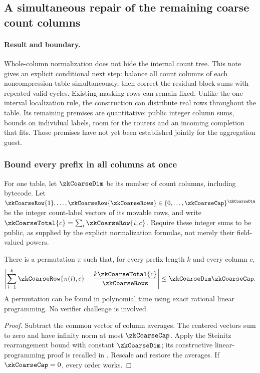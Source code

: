 \subsection{A simultaneous repair of the remaining coarse count columns}\label{note:zk-count-coarse-balance}

\paragraph{Result and boundary.} Whole-column normalization does not hide the internal count tree. This note gives an explicit conditional next step: balance all count columns of each noncompression table simultaneously, then correct the residual block sums with repeated valid cycles. Existing masking rows can remain fixed. Unlike the one-interval localization rule, the construction can distribute real rows throughout the table. Its remaining premises are quantitative: public integer column sums, bounds on individual labels, room for the routers and an incoming completion that fits. Those premises have not yet been established jointly for the aggregation guest.

\subsubsection{Bound every prefix in all columns at once}

For one table, let $\zkCoarseDim$ be its number of count columns, including bytecode. Let $\zkCoarseRow{1},\ldots,\zkCoarseRow{\zkCoarseRows}\in\{0,\ldots,\zkCoarseCap\}^{\zkCoarseDim}$ be the integer count-label vectors of its movable rows, and write $\zkCoarseTotal{c}=\sum_i\zkCoarseRow{i,c}$. Require these integer sums to be public, as supplied by the explicit normalization formulas, not merely their field-valued powers.

\begin{lemma}\label{lem:zk-vector-count-order}
There is a permutation $\pi$ such that, for every prefix length $k$ and every column $c$,
\[
 \left|\sum_{i=1}^{k}\zkCoarseRow{\pi(i),c}
       -\frac{k\zkCoarseTotal{c}}{\zkCoarseRows}\right|
 \le\zkCoarseDim\zkCoarseCap.
\]
A permutation can be found in polynomial time using exact rational linear programming. No verifier challenge is involved.
\end{lemma}
\begin{proof}
Subtract the common vector of column averages. The centered vectors sum to zero and have infinity norm at most $\zkCoarseCap$. Apply the Steinitz rearrangement bound with constant $\zkCoarseDim$; its constructive linear-programming proof is recalled in \cite[Section~1.2]{steinitz}. Rescale and restore the averages. If $\zkCoarseCap=0$, every order works.
\end{proof}

